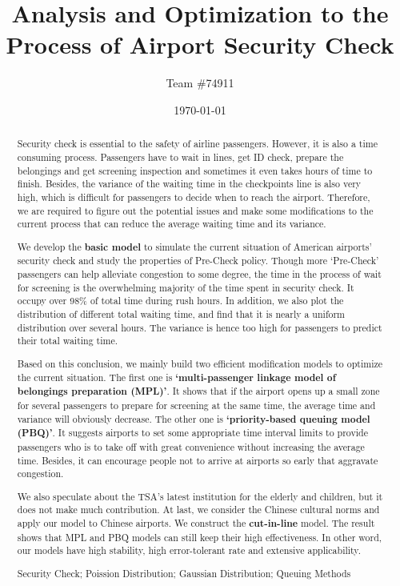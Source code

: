 \documentclass{mcmthesis}
\title{Analysis and Optimization to the Process of Airport Security Check}%
\author{\small Team \#74911}
\date{\today}
\begin{document}
\begin{abstract}
\par Security check is essential to the safety of airline passengers. However, it is also a time
consuming process. Passengers have to wait in lines, get ID check, prepare the belongings and get screening inspection and sometimes it even takes hours of time to finish.
Besides, the variance of the waiting time in the checkpoints line is also very high, which
is difficult for passengers to decide when to reach the airport. Therefore, we are required
to figure out the potential issues and make some modifications to the current process
that can reduce the average waiting time and its variance.
\par We develop the \textbf{basic model} to simulate the current situation of American airports'
security check and study the properties of Pre-Check policy. Though more `Pre-Check'
passengers can help alleviate congestion to some degree, the time in the process of wait
for screening is the overwhelming majority of the time spent in security check. It occupy
over 98\% of total time during rush hours. In addition, we also plot the distribution of
different total waiting time, and find that it is nearly a uniform distribution over several
hours. The variance is hence too high for passengers to predict their total waiting time.
\par Based on this conclusion, we mainly build two efficient modification models to optimize the current situation. The first one is \textbf{`multi-passenger linkage model of belongings preparation (MPL)'}. It shows that if the airport opens up a small zone for several
passengers to prepare for screening at the same time, the average time and variance will
obviously decrease. The other one is \textbf{`priority-based queuing model (PBQ)'}. It suggests
airports to set some appropriate time interval limits to provide passengers who is to take
off with great convenience without increasing the average time. Besides, it can encourage people not to arrive at airports so early that aggravate congestion.
\par We also speculate about the TSA's latest institution for the elderly and children, but
it does not make much contribution. At last, we consider the Chinese cultural norms
and apply our model to Chinese airports. We construct the \textbf{cut-in-line} model. The result
shows that MPL and PBQ models can still keep their high effectiveness. In other word,
our models have high stability, high error-tolerant rate and extensive applicability.
\begin{keywords}
Security Check; Poission Distribution; Gaussian Distribution; Queuing Methods
\end{keywords}
\end{abstract}
\maketitle
\end{document}
